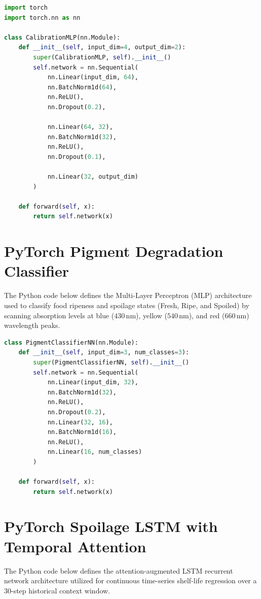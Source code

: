 \begin{tcolorbox}[colback=gray!5,colframe=gray!30,title=PyTorch Calibration MLP (Python),breakable]
\begin{lstlisting}[language=Python]
import torch
import torch.nn as nn

class CalibrationMLP(nn.Module):
    def __init__(self, input_dim=4, output_dim=2):
        super(CalibrationMLP, self).__init__()
        self.network = nn.Sequential(
            nn.Linear(input_dim, 64),
            nn.BatchNorm1d(64),
            nn.ReLU(),
            nn.Dropout(0.2),
            
            nn.Linear(64, 32),
            nn.BatchNorm1d(32),
            nn.ReLU(),
            nn.Dropout(0.1),
            
            nn.Linear(32, output_dim)
        )
        
    def forward(self, x):
        return self.network(x)
\end{lstlisting}
\end{tcolorbox}

\newpage
\section{PyTorch Pigment Degradation Classifier}
The Python code below defines the Multi-Layer Perceptron (MLP) architecture used to classify food ripeness and spoilage states (Fresh, Ripe, and Spoiled) by scanning absorption levels at blue ($430\,\text{nm}$), yellow ($540\,\text{nm}$), and red ($660\,\text{nm}$) wavelength peaks.

\begin{tcolorbox}[colback=gray!5,colframe=gray!30,title=PyTorch Pigment Classifier NN (Python),breakable]
\begin{lstlisting}[language=Python]
class PigmentClassifierNN(nn.Module):
    def __init__(self, input_dim=3, num_classes=3):
        super(PigmentClassifierNN, self).__init__()
        self.network = nn.Sequential(
            nn.Linear(input_dim, 32),
            nn.BatchNorm1d(32),
            nn.ReLU(),
            nn.Dropout(0.2),
            nn.Linear(32, 16),
            nn.BatchNorm1d(16),
            nn.ReLU(),
            nn.Linear(16, num_classes)
        )
        
    def forward(self, x):
        return self.network(x)
\end{lstlisting}
\end{tcolorbox}

\newpage
\section{PyTorch Spoilage LSTM with Temporal Attention}
The Python code below defines the attention-augmented LSTM recurrent network architecture utilized for continuous time-series shelf-life regression over a 30-step historical context window.


